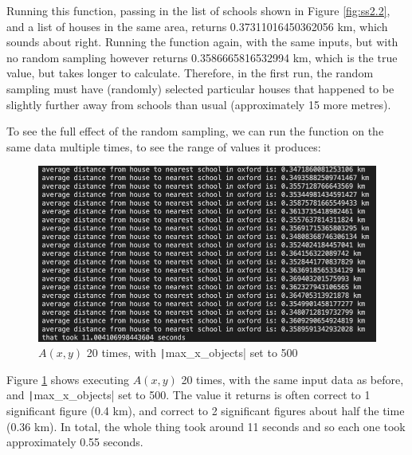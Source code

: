 \documentclass[12pt]{report}
\newcommand{\pil}[1]{\protect\texttt|#1|}
\begin{document}
Running this function, passing in the list of schools shown in Figure \ref{fig:ss2.2}, and a list of houses in the same area, returns 0.37311016450362056 \unit{km}, which sounds about right. Running the function again, with the same inputs, but with no random sampling however returns 0.3586665816532994 \unit{km}, which is the true value, but takes longer to calculate. Therefore, in the first run, the random sampling must have (randomly) selected particular houses that happened to be slightly further away from schools than usual (approximately 15 more metres).

\begin{center}
\end{center}

To see the full effect of the random sampling, we can run the function on the same data multiple times, to see the range of values it produces:

\begin{figure}[H]
\centering
\includegraphics[width=14cm]{ss3.1.png}
\caption{$A\left(x,y\right)$ 20 times, with \pil{max_x_objects} set to 500}\label{fig:ss3.1}
\end{figure}

Figure \ref{fig:ss3.1} shows executing $A\left(x,y\right)$ 20 times, with the same input data as before, and \pil{max_x_objects} set to 500. The value it returns is often correct to 1 significant figure (0.4 \unit{km}), and correct to 2 significant figures about half the time (0.36 \unit{km}). In total, the whole thing took around 11 seconds and so each one took approximately 0.55 seconds.
\end{document}
